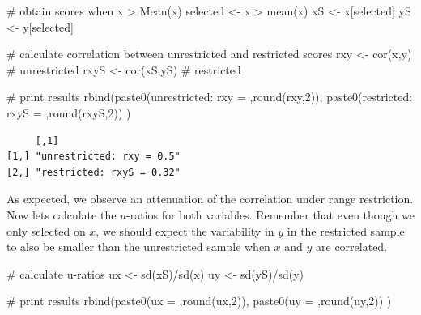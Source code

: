 \documentclass[
  letterpaper,
  DIV=11,
  numbers=noendperiod]{scrreprt}
\newenvironment{Shaded}{\begin{snugshade}}{\end{snugshade}}
\newcommand{\CommentTok}[1]{\textcolor[rgb]{0.37,0.37,0.37}{#1}}
\newcommand{\DecValTok}[1]{\textcolor[rgb]{0.68,0.00,0.00}{#1}}
\newcommand{\FunctionTok}[1]{\textcolor[rgb]{0.28,0.35,0.67}{#1}}
\newcommand{\NormalTok}[1]{\textcolor[rgb]{0.00,0.23,0.31}{#1}}
\newcommand{\OtherTok}[1]{\textcolor[rgb]{0.00,0.23,0.31}{#1}}
\newcommand{\SpecialCharTok}[1]{\textcolor[rgb]{0.37,0.37,0.37}{#1}}
\newcommand{\StringTok}[1]{\textcolor[rgb]{0.13,0.47,0.30}{#1}}
\begin{document}
\begin{Shaded}
\begin{Highlighting}[]
\CommentTok{\# obtain scores when x \textgreater{} Mean(x)}
\NormalTok{selected }\OtherTok{\textless{}{-}}\NormalTok{ x }\SpecialCharTok{\textgreater{}} \FunctionTok{mean}\NormalTok{(x)}
\NormalTok{xS }\OtherTok{\textless{}{-}}\NormalTok{ x[selected]}
\NormalTok{yS }\OtherTok{\textless{}{-}}\NormalTok{ y[selected]}

\CommentTok{\# calculate correlation between unrestricted and restricted scores}
\NormalTok{rxy }\OtherTok{\textless{}{-}} \FunctionTok{cor}\NormalTok{(x,y) }\CommentTok{\# unrestricted}
\NormalTok{rxyS }\OtherTok{\textless{}{-}} \FunctionTok{cor}\NormalTok{(xS,yS) }\CommentTok{\# restricted}

\CommentTok{\# print results}
\FunctionTok{rbind}\NormalTok{(}\FunctionTok{paste0}\NormalTok{(}\StringTok{\textquotesingle{}unrestricted: rxy = \textquotesingle{}}\NormalTok{,}\FunctionTok{round}\NormalTok{(rxy,}\DecValTok{2}\NormalTok{)),}
      \FunctionTok{paste0}\NormalTok{(}\StringTok{\textquotesingle{}restricted: rxyS = \textquotesingle{}}\NormalTok{,}\FunctionTok{round}\NormalTok{(rxyS,}\DecValTok{2}\NormalTok{))}
\NormalTok{      )}
\end{Highlighting}
\end{Shaded}

\begin{verbatim}
     [,1]                     
[1,] "unrestricted: rxy = 0.5"
[2,] "restricted: rxyS = 0.32"
\end{verbatim}

As expected, we observe an attenuation of the correlation under range
restriction. Now lets calculate the \(u\)-ratios for both variables.
Remember that even though we only selected on \(x\), we should expect
the variability in \(y\) in the restricted sample to also be smaller
than the unrestricted sample when \(x\) and \(y\) are correlated.

\begin{Shaded}
\begin{Highlighting}[]
\CommentTok{\# calculate u{-}ratios}
\NormalTok{ux }\OtherTok{\textless{}{-}} \FunctionTok{sd}\NormalTok{(xS)}\SpecialCharTok{/}\FunctionTok{sd}\NormalTok{(x)}
\NormalTok{uy }\OtherTok{\textless{}{-}} \FunctionTok{sd}\NormalTok{(yS)}\SpecialCharTok{/}\FunctionTok{sd}\NormalTok{(y)}

\CommentTok{\# print results}
\FunctionTok{rbind}\NormalTok{(}\FunctionTok{paste0}\NormalTok{(}\StringTok{\textquotesingle{}ux = \textquotesingle{}}\NormalTok{,}\FunctionTok{round}\NormalTok{(ux,}\DecValTok{2}\NormalTok{)),}
      \FunctionTok{paste0}\NormalTok{(}\StringTok{\textquotesingle{}uy = \textquotesingle{}}\NormalTok{,}\FunctionTok{round}\NormalTok{(uy,}\DecValTok{2}\NormalTok{))}
\NormalTok{      )}
\end{Highlighting}
\end{Shaded}
\end{document}
